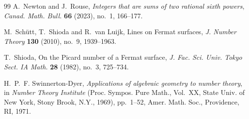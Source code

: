 \documentclass[11pt]{article}
\begin{document}
\begin{thebibliography}{99}
A.~Newton and J.~Rouse,
\newblock \emph{Integers that are sums of two rational sixth powers},
\newblock \emph{Canad. Math. Bull.} \textbf{66} (2023), no.~1, 166--177.


M.~Sch\"utt, T.~Shioda and R.~van Luijk,
\newblock Lines on Fermat surfaces,
\newblock \emph{J. Number Theory} \textbf{130} (2010), no.~9, 1939--1963.


T.~Shioda,
\newblock On the Picard number of a Fermat surface,
\newblock \emph{J. Fac. Sci. Univ. Tokyo Sect. IA Math.} \textbf{28} (1982), no.~3, 725--734.

H.~P.~F. Swinnerton-Dyer,
\newblock \emph{Applications of algebraic geometry to number theory},
\newblock in \emph{Number Theory Institute}
(Proc. Sympos. Pure Math., Vol.~XX, State Univ. of New York, Stony Brook, N.Y., 1969),
pp.~1--52, Amer. Math. Soc., Providence, RI, 1971.

\end{thebibliography}
\end{document}
